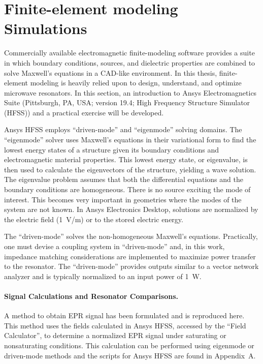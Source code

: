 \section{Finite-element modeling Simulations}
Commercially available electromagnetic finite-modeling software provides a suite in which boundary conditions, sources, and dielectric properties are combined to solve Maxwell's equations in a CAD-like environment. In this thesis, finite-element modeling is heavily relied upon to design, understand, and optimize microwave resonators. In this section, an introduction to Ansys Electromagnetics Suite (Pittsburgh, PA, USA; version 19.4; High Frequency Structure Simulator (HFSS)) and a practical exercise will be developed. 

Ansys HFSS employs ``driven-mode'' and ``eigenmode'' solving domains. The ``eigenmode'' solver uses Maxwell's equations in their variational form to find the lowest energy states of a structure given its boundary conditions and electromagnetic material properties. \cite{sadiku2000numerical,jin2015finite} This lowest energy state, or eigenvalue, is then used to calculate the eigenvectors of the structure, yielding a wave solution. The eigenvalue problem assumes that both the differential equations and the boundary conditions are homogeneous. There is no source exciting the mode of interest. This becomes very important in geometries where the modes of the system are not known. In Ansys Electronics Desktop, solutions are normalized by the electric field (1~V/m) or to the stored electric energy.

The ``driven-mode'' solves the non-homogeneous Maxwell's equations. Practically, one must devise a coupling system in ``driven-mode'' and, in this work, impedance matching considerations are implemented to maximize power transfer to the resonator. The ``driven-mode'' provides outputs similar to a vector network analyzer and is typically normalized to an input power of 1~W. 

\paragraph*{Signal Calculations and Resonator Comparisons.}
A method to obtain EPR signal has been formulated and is reproduced here. \cite{misrabook} This method uses the fields calculated in Ansys HFSS, accessed by the ``Field Calculator'', to determine a normalized EPR signal under saturating or nonsaturating conditions. This calculation can be performed using eigenmode or driven-mode methods and the scripts for Ansys HFSS are found in Appendix~A. 

